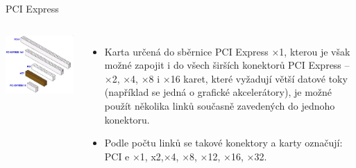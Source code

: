 \documentclass[aspectratio=43]{beamer}
\begin{document}
\begin{frame}{PCI Express}
	\begin{columns}
		\includegraphics[width=1\linewidth]{extrahovane_obrazky/img_2_page11_43.png}
		\begin{itemize}
			\item Karta určená do sběrnice PCI Express ×1, kterou je však možné zapojit i do všech širších konektorů PCI Express – ×2, ×4, ×8 i ×16
			      \itemU karet, které vyžadují větší datové toky (například se jedná o grafické akcelerátory), je možné použít několika linků současně zavedených do jednoho konektoru.
			\item Podle počtu linků se takové konektory a karty označují: PCI e  ×1, x2,×4, ×8, ×12, ×16, ×32.
		\end{itemize}
	\end{columns}
	
\end{frame}
\end{document}
